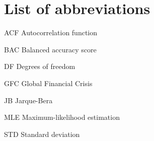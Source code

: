 \section*{List of abbreviations}

\begin{abbrv}
\item[ACF] Autocorrelation function
\item[BAC] Balanced accuracy score
\item[DF] Degrees of freedom
\item[GFC] Global Financial Crisis
\item[JB] Jarque-Bera
\item[MLE] Maximum-likelihood estimation
\item[STD] Standard deviation
\
\end{abbrv}
